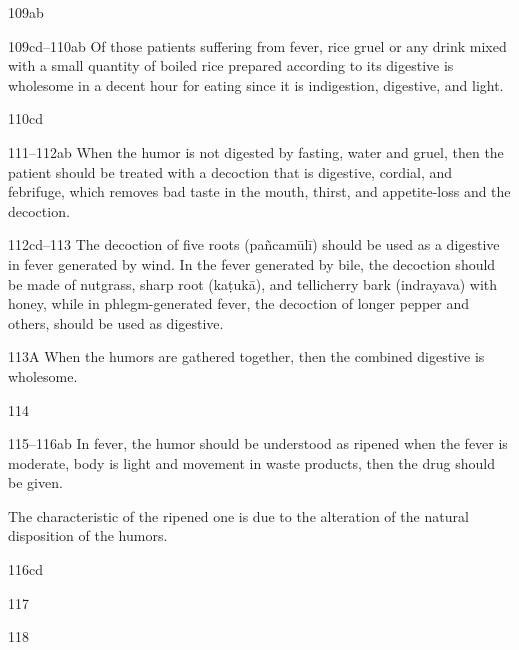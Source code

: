 \begin{translation}
    
   \item[109ab]  
    
    \item[109cd--110ab]  Of those patients suffering from fever, rice gruel or any
    drink mixed with a small quantity of boiled rice prepared according to
    its digestive is wholesome in a decent hour for eating since it is
    indigestion, digestive, and light.
    
   \item[110cd]  
    
    \item[111--112ab]  When the humor is not digested by fasting, water and 
gruel,
    then the patient should be treated with a decoction that is digestive,
    cordial, and febrifuge, which removes bad taste in the mouth, thirst,
    and appetite-loss and the decoction.
    
    \item[112cd--113]  The decoction of five roots (pañcamūlī) should be used as 
a
    digestive in fever generated by wind.  In the fever generated by bile,
    the decoction should be made of nutgrass, sharp root (kaṭukā), and
    tellicherry bark (indrayava)  with honey, while in
    phlegm-generated fever, the decoction of longer pepper and others,
    should be used as digestive.
    
    
    
    \item[113A]  When the humors are gathered together, then the combined 
digestive
    is wholesome.
    
   \item[114]  
    
    \item[115--116ab]  In fever, the humor should be understood as ripened 
when the
    fever is moderate, body is light and movement in waste products, then
    the drug should be given.
    
    The characteristic of the ripened one is due to the alteration of the
    natural disposition of the humors.
    
   \item[116cd]  
    
   \item[117]  
    
   \item[118]  
    

\end{translation}
